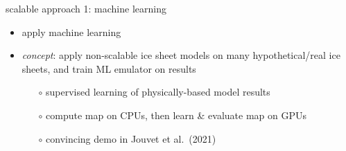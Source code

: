 \documentclass[svgnames,
               hyperref={colorlinks,citecolor=DeepPink4,linkcolor=FireBrick,urlcolor=Maroon},
               usepdftitle=false]  %
               {beamer}
\begin{document}
\begin{frame}{scalable approach 1: machine learning}

\begin{itemize}
\item apply \alert{machine learning}
\item \emph{concept}: apply non-scalable ice sheet models on many hypothetical/real ice sheets, and train ML \alert{emulator} on results
    \begin{itemize}
    \item[$\circ$] supervised learning of physically-based model results
    \item[$\circ$] compute map on CPUs, then learn \& evaluate map on GPUs
    \item[$\circ$] convincing demo in Jouvet et al.~(2021)
    \end{itemize}
\end{itemize}

\vspace{3mm}
\begin{minipage}[t][60cm][t]{\textwidth}
\begin{center}
\end{center}
\end{minipage}
\end{frame}
\end{document}
